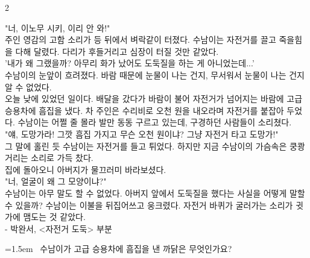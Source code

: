 \documentclass[11pt, a4paper]{article}
\begin{document}
\begin{multicols}{2}


\vspace{1mm}
\vspace{0.5mm}

\begin{passagebox}
\noindent{}"너, 이노무 시키, 이리 안 와!" \\
주인 영감의 고함 소리가 등 뒤에서 벼락같이 터졌다. 수남이는 자전거를 끌고 죽을힘을 다해 달렸다. 다리가 후들거리고 심장이 터질 것만 같았다. \\
'내가 왜 그랬을까? 아무리 화가 났어도 도둑질을 하는 게 아니었는데...' \\
수남이의 눈앞이 흐려졌다. 바람 때문에 눈물이 나는 건지, 무서워서 눈물이 나는 건지 알 수 없었다. \\
오늘 낮에 있었던 일이다. 배달을 갔다가 바람이 불어 자전거가 넘어지는 바람에 고급 승용차에 흠집을 냈다. 차 주인은 수리비로 오천 원을 내오라며 자전거를 붙잡아 두었다. 수남이는 어쩔 줄 몰라 발만 동동 구르고 있는데, 구경하던 사람들이 소리쳤다. \\
"얘, 도망가라! 그깟 흠집 가지고 무슨 오천 원이냐? 그냥 자전거 타고 도망가!" \\
그 말에 홀린 듯 수남이는 자전거를 들고 튀었다. 하지만 지금 수남이의 가슴속은 쿵쾅거리는 소리로 가득 찼다. \\
집에 돌아오니 아버지가 물끄러미 바라보셨다. \\
"너, 얼굴이 왜 그 모양이냐?" \\
수남이는 아무 말도 할 수 없었다. 아버지 앞에서 도둑질을 했다는 사실을 어떻게 말할 수 있을까? 수남이는 이불을 뒤집어쓰고 웅크렸다. 자전거 바퀴가 굴러가는 소리가 귓가에 맴도는 것 같았다.
\\[0.5em]
- 박완서, <자전거 도둑> 부분
\end{passagebox}
\vspace{1mm}

\noindent\begin{minipage}{\columnwidth}
\vspace{2mm}
{\hangindent=1.5em  ~수남이가 고급 승용차에 흠집을 낸 까닭은 무엇인가요?\par}


\end{minipage}
\end{multicols}
\end{document}

